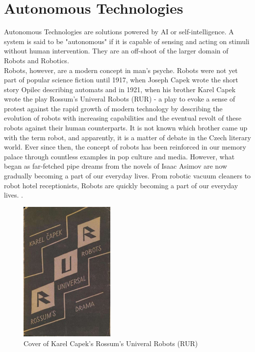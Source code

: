 \section{Autonomous Technologies}
Autonomous Technologies are solutions powered by AI or self-intelligence. A system is said to be "autonomous" if it is capable of sensing and acting on stimuli without human intervention. They are an off-shoot of the larger domain of Robots and Robotics. 
\\ 

Robots, however, are a modern concept in man's psyche. Robots were not yet part of popular science fiction until 1917, when Joseph Capek wrote the short story Opilec describing automats and in 1921, when his brother Karel Capek wrote the play Rossum’s Univeral Robots (RUR) - a play to evoke a sense of protest against the rapid growth of modern technology by describing the evolution of robots with increasing capabilities and the eventual revolt of these robots against their human counterparts. It is not known which brother came up with the term robot, and apparently, it is a matter of debate in the Czech literary world. Ever since then, the concept of robots has been reinforced in our memory palace through countless examples in pop culture and media. However, what began as far-fetched pipe dreams from the novels of Isaac Asimov are now gradually becoming a part of our everyday lives. From robotic vacuum cleaners to robot hotel receptionists, Robots are quickly becoming a part of our everyday lives. \cite{hockstein2007history}. 
\begin{figure}[H]
    \centering
    \includegraphics[width=\textwidth,height=7cm,keepaspectratio=true]{src/Images/Rosumovi_Univerzální_Roboti_1920.jpg}
    \caption{
     Cover of Karel Capek's Rossum’s Univeral Robots (RUR) \cite{rur_img}  
    }
\end{figure}
\\


